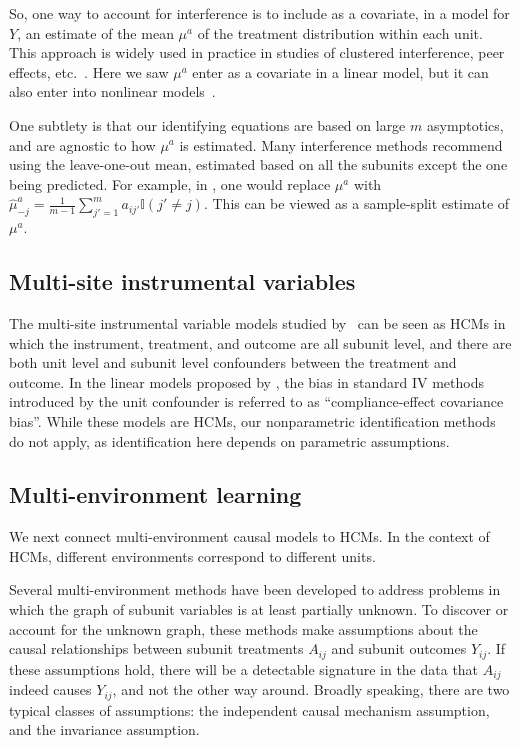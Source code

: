 \documentclass[12pt]{article}
\begin{document}
So, one way to account for interference is to include as a covariate, in a model for $Y$, an estimate of the mean $\mu^a$ of the treatment distribution within each unit. This approach is widely used in practice in studies of clustered interference, peer effects, etc.~\citep{Duflo2011-ru,Angrist2014-ms}.
Here we saw $\mu^a$ enter as a covariate in a linear model, but it can also enter into nonlinear models~\citep{Lee2022-jd}.

One subtlety is that our identifying equations are based on large $m$ asymptotics, and are agnostic to how $\mu^a$ is estimated.
Many interference methods recommend using the leave-one-out mean, estimated based on all the subunits except the one being predicted. For example, in , one would replace $\mu^a$ with $\hat{\mu}^a_{-j} = \frac{1}{m-1}\sum_{j'=1}^m a_{ij'} \mathbb{I}(j'\neq j)$.
This can be viewed as a sample-split estimate of $\mu^a$.

 
\subsection{Multi-site instrumental variables} \label{apx:multisite_iv}

The multi-site instrumental variable models studied by~\citet{Reardon2014-fy,Raudenbush2012-es} can be seen as HCMs in which the instrument, treatment, and outcome are all subunit level, and there are both unit level and subunit level confounders between the treatment and outcome.
In the linear models proposed by \citet{Reardon2014-fy,Raudenbush2012-es}, the bias in standard IV methods introduced by the unit confounder is referred to as ``compliance-effect covariance bias''.
While these models are HCMs, our nonparametric identification methods do not apply, as identification here depends on parametric assumptions.

\subsection{Multi-environment learning} \label{apx:multi-enviro}

We next connect multi-environment causal models to HCMs.
In the context of HCMs, different environments correspond to different units.

Several multi-environment methods have been developed to address problems in which the graph of subunit variables is at least partially unknown.
To discover or account for the unknown graph, these methods make assumptions about the causal relationships between subunit treatments $A_{ij}$ and subunit outcomes $Y_{ij}$.
If these assumptions hold, there will be a detectable signature in the data that $A_{ij}$ indeed causes $Y_{ij}$, and not the other way around.
Broadly speaking, there are two typical classes of assumptions: the independent causal mechanism assumption, and the invariance assumption.
\end{document}

